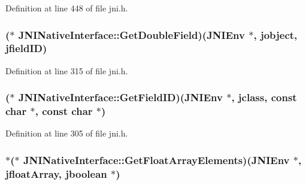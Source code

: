 Definition at line 448 of file jni.\-h.

\hypertarget{struct_j_n_i_native_interface_a55b04082148e418474a3be0640c3e503}{
\subsubsection[{Get\-Double\-Field}]{($\ast$ J\-N\-I\-Native\-Interface\-::\-Get\-Double\-Field)({\bf J\-N\-I\-Env} $\ast$, {\bf jobject}, {\bf jfield\-I\-D})}}\label{struct_j_n_i_native_interface_a55b04082148e418474a3be0640c3e503}


Definition at line 315 of file jni.\-h.

\hypertarget{struct_j_n_i_native_interface_ac8fb9ac804e94b7e6d71efad3d8868cb}{
\subsubsection[{Get\-Field\-I\-D}]{($\ast$ J\-N\-I\-Native\-Interface\-::\-Get\-Field\-I\-D)({\bf J\-N\-I\-Env} $\ast$, {\bf jclass}, const char $\ast$, const char $\ast$)}}\label{struct_j_n_i_native_interface_ac8fb9ac804e94b7e6d71efad3d8868cb}


Definition at line 305 of file jni.\-h.

\hypertarget{struct_j_n_i_native_interface_a730c79cd6c7bc4878a6d8deadef9b596}{
\subsubsection[{Get\-Float\-Array\-Elements}]{$\ast$($\ast$ J\-N\-I\-Native\-Interface\-::\-Get\-Float\-Array\-Elements)({\bf J\-N\-I\-Env} $\ast$, {\bf jfloat\-Array}, {\bf jboolean} $\ast$)}}\label{struct_j_n_i_native_interface_a730c79cd6c7bc4878a6d8deadef9b596}


